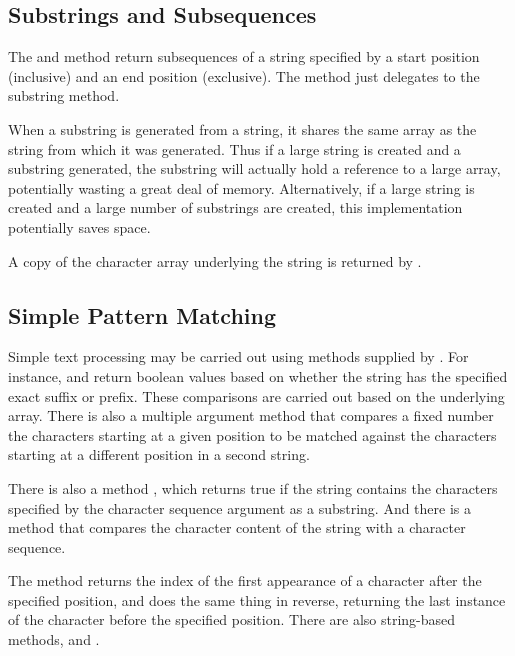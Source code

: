 \subsection{Substrings and Subsequences}

The  and method return subsequences of a
string specified by a start position (inclusive) and an end position
(exclusive).  The  method just delegates to
the substring method.

When a substring is generated from a string, it shares the same array
as the string from which it was generated.  Thus if a large string is
created and a substring generated, the substring will actually hold a
reference to a large array, potentially wasting a great deal of
memory.  Alternatively, if a large string is created and a large
number of substrings are created, this implementation potentially
saves space.

A copy of the character array underlying the string is returned
by .  

\subsection{Simple Pattern Matching}

Simple text processing may be carried out using methods supplied
by .  For instance,  and
 return boolean values based on whether
the string has the specified exact suffix or prefix.  These
comparisons are carried out based on the underlying 
array.  There is also a multiple argument 
method that compares a fixed number the characters starting at a given
position to be matched against the characters starting at a different
position in a second string.

There is also a method , which returns
true if the string contains the characters specified by the character
sequence argument as a substring.  And there is a method
 that compares the character content
of the string with a character sequence.

The  method returns the index of the first
appearance of a character after the specified position, and
 does the same thing in reverse,
returning the last instance of the character before the specified
position.  There are also string-based methods,  and
.

